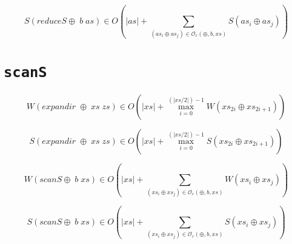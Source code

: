 \documentclass[a4paper,10pt]{article}
\begin{document}
\bigskip

\begin{equation*}
    S \left( reduceS \oplus \; b \; as \right) \in
    O \left( \vert as \vert + \sum_{(as_i \oplus as_j) \in \mathcal{O}_r(\oplus,b,xs)} S \left( as_i \oplus as_j \right) \right)
\end{equation*}


\bigskip


\section*{\texttt{scanS}}


\begin{equation*}
    W \left( expandir \;\oplus \;xs \;zs \right) \in
    O \left( \vert xs \vert + \max_{i=0}^{(\vert xs / 2 \vert) - 1} W \left( xs_{2i} \oplus xs_{2i+1} \right) \right)
\end{equation*}

\begin{equation*}
    S \left( expandir \;\oplus \;xs \;zs \right) \in
    O \left( \vert xs \vert + \max_{i=0}^{(\vert xs / 2 \vert) - 1} S \left( xs_{2i} \oplus xs_{2i+1} \right) \right)
\end{equation*}

\bigskip

\begin{equation*}
    W \left( scanS \oplus \; b \; xs \right) \in
    O \left( \vert xs \vert + \sum_{(xs_i \oplus xs_j) \in \mathcal{O}_r(\oplus,b,xs)} W \left( xs_i \oplus xs_j \right) \right)
\end{equation*}

\begin{equation*}
    S \left( scanS \oplus \; b \; xs \right) \in
    O \left( \vert xs \vert + \sum_{(xs_i \oplus xs_j) \in \mathcal{O}_r(\oplus,b,xs)} S \left( xs_i \oplus xs_j \right) \right)
\end{equation*}




\end{document}
